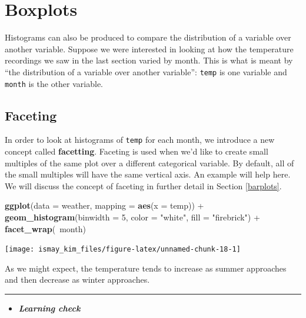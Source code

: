 \documentclass[]{tufte-book}
\newenvironment{Shaded}{\begin{snugshade}}{\end{snugshade}}
\newcommand{\KeywordTok}[1]{\textcolor[rgb]{0.13,0.29,0.53}{\textbf{{#1}}}}
\newcommand{\DataTypeTok}[1]{\textcolor[rgb]{0.13,0.29,0.53}{{#1}}}
\newcommand{\DecValTok}[1]{\textcolor[rgb]{0.00,0.00,0.81}{{#1}}}
\newcommand{\StringTok}[1]{\textcolor[rgb]{0.31,0.60,0.02}{{#1}}}
\newcommand{\NormalTok}[1]{{#1}}
\newenvironment{rmdblock}[1]
  {\begin{shaded*}
  \begin{itemize}
  \renewcommand{\labelitemi}{
    \raisebox{-.7\height}[0pt][0pt]{
    }
  }
  \item
  }
  {
  \end{itemize}
  \end{shaded*}
  }
\newenvironment{learncheck}
  {\begin{rmdblock}{warning}}
  {\end{rmdblock}}
\begin{document}
\section{Boxplots}\label{boxplots}

Histograms can also be produced to compare the distribution of a
variable over another variable. Suppose we were interested in looking at
how the temperature recordings we saw in the last section varied by
month. This is what is meant by ``the distribution of a variable over
another variable'': \texttt{temp} is one variable and \texttt{month} is
the other variable.

\subsection{Faceting}\label{faceting}

In order to look at histograms of \texttt{temp} for each month, we
introduce a new concept called \textbf{facetting}. Faceting is used when
we'd like to create small multiples of the same plot over a different
categorical variable. By default, all of the small multiples will have
the same vertical axis. An example will help here. We will discuss the
concept of faceting in further detail in Section \ref{barplots}.

\begin{Shaded}
\begin{Highlighting}[]
\KeywordTok{ggplot}\NormalTok{(}\DataTypeTok{data =} \NormalTok{weather, }\DataTypeTok{mapping =} \KeywordTok{aes}\NormalTok{(}\DataTypeTok{x =} \NormalTok{temp)) +}
\StringTok{  }\KeywordTok{geom_histogram}\NormalTok{(}\DataTypeTok{binwidth =} \DecValTok{5}\NormalTok{, }\DataTypeTok{color =} \StringTok{"white"}\NormalTok{, }\DataTypeTok{fill =} \StringTok{"firebrick"}\NormalTok{) +}
\StringTok{  }\KeywordTok{facet_wrap}\NormalTok{(~month)}
\end{Highlighting}
\end{Shaded}

\texttt{[image: ismay\_kim\_files/figure-latex/unnamed-chunk-18-1]}

As we might expect, the temperature tends to increase as summer
approaches and then decrease as winter approaches.

\begin{center}\rule{0.5\linewidth}{\linethickness}\end{center}

\begin{learncheck}
\textbf{\emph{Learning check}}
\end{learncheck}
\end{document}
